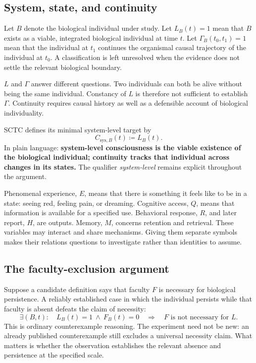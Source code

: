 \documentclass[11pt,letterpaper]{article}
\newcommand{\Csys}{C_{\mathrm{sys},B}(t)}
\newcommand{\Lsys}{L_B(t)}
\begin{document}
\subsection*{System, state, and continuity}
Let $B$ denote the biological individual under study. Let $L_B(t)=1$ mean that $B$ exists as a viable, integrated biological individual at time $t$. Let $\Gamma_B(t_0,t_1)=1$ mean that the individual at $t_1$ continues the organismal causal trajectory of the individual at $t_0$. A classification is left unresolved when the evidence does not settle the relevant biological boundary.

$L$ and $\Gamma$ answer different questions. Two individuals can both be alive without being the same individual. Constancy of $L$ is therefore not sufficient to establish $\Gamma$. Continuity requires causal history as well as a defensible account of biological individuality.

SCTC defines its minimal system-level target by
\begin{equation}
\Csys\coloneqq\Lsys.
\label{eq:definition}
\end{equation}
In plain language: \textbf{system-level consciousness is the viable existence of the biological individual; continuity tracks that individual across changes in its states.} The qualifier \emph{system-level} remains explicit throughout the argument.

Phenomenal experience, $E$, means that there is something it feels like to be in a state: seeing red, feeling pain, or dreaming. Cognitive access, $Q$, means that information is available for a specified use. Behavioral response, $R$, and later report, $H$, are outputs. Memory, $M$, concerns retention and retrieval. These variables may interact and share mechanisms. Giving them separate symbols makes their relations questions to investigate rather than identities to assume.

\subsection*{The faculty-exclusion argument}
Suppose a candidate definition says that faculty $F$ is necessary for biological persistence. A reliably established case in which the individual persists while that faculty is absent defeats the claim of necessity:
\begin{equation}
\exists(B,t):\quad L_B(t)=1\ \land\ F_B(t)=0
\quad\Longrightarrow\quad
F\text{ is not necessary for }L.
\label{eq:exclusion}
\end{equation}
This is ordinary counterexample reasoning. The experiment need not be new: an already published counterexample still excludes a universal necessity claim. What matters is whether the observation establishes the relevant absence and persistence at the specified scale.
\end{document}

